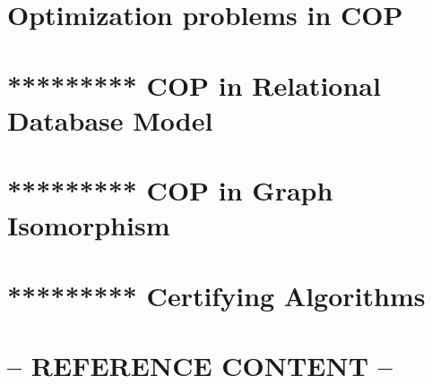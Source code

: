 \section{Optimization problems in COP}
\label{sec:surveycopopt}


\section{********* COP in Relational Database Model}
\label{sec:surveyrdbm}
 

\section{********* COP in Graph Isomorphism}
\label{sec:surveygraphiso}
 

\section{********* Certifying Algorithms}
\label{sec:surveycertalgo}
 


\section*{-- REFERENCE CONTENT --}



